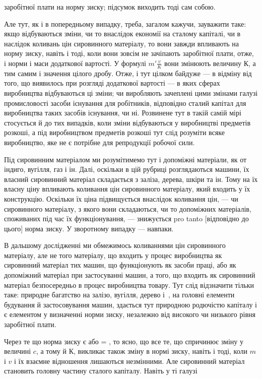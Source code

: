 \parcont{}  %
заробітної плати на норму зиску; підсумок виходить тоді сам
собою.

Але тут, як і в попередньому випадку, треба, загалом кажучи, зауважити таке: якщо відбуваються
зміни, чи то внаслідок економії на сталому капіталі, чи в наслідок коливань цін сировинного
матеріалу, то вони завжди впливають на норму
зиску, навіть і тоді, коли вони зовсім не зачіпають заробітної плати, отже, і норми і маси
додаткової вартості. У формулі $m' \frac{v}{K}$ вони змінюють величину $К$, а тим самим і значення цілого дробу.
Отже, і тут цілком байдуже — в відміну від того, що виявилось при розгляді додаткової вартості — в
яких сферах виробництва відбуваються ці зміни; чи виробляють зачеплені цими змінами галузі
промисловості засоби існування для робітників,
відповідно сталий капітал для виробництва таких засобів існування, чи ні. Розвинене тут в такій
самій мірі стосується й до
тих випадків, коли зміни відбуваються у виробництві предметів
розкоші, а під виробництвом предметів розкоші тут слід розуміти всяке виробництво, яке не є потрібне
для репродукції робочої сили.

Під сировинним матеріалом ми розумітимемо тут і допоміжні
матеріали, як от індиго, вугілля, газ і ін. Далі, оскільки в цій
рубриці розглядаються машини, їх власний сировинний матеріал
складається з заліза, дерева, шкіри та ін. Тому на їх власну
ціну впливають коливання цін сировинного матеріалу, який входить у їх конструкцію. Оскільки їх ціна
підвищується внаслідок коливання цін, — чи сировинного матеріалу, з якого вони складаються, чи то
допоміжних матеріалів, споживаних під час
їх функціонування, — знижується pro tanto [відповідно до цього]
норма зиску. У зворотному випадку — навпаки.

В дальшому дослідженні ми обмежимось коливаннями цін сировинного матеріалу, але не того матеріалу,
що входить у процес виробництва як сировинний матеріал тих машин, що функціонують як засоби праці,
або як допоміжний матеріал при застосуванні машин, а того, що входить як сировинний матеріал
безпосередньо в процес виробництва товару. Тут слід відзначити тільки таке: природне багатство на
залізо, вугілля, дерево
і~, на головні елементи будування й застосовування машин,
здається тут природною родючістю капіталу і є елементом
у визначенні норми зиску, незалежно від високого чи низького
рівня заробітної плати.

Через те що норма зиску є  або = , то ясно, що все те, що спричинює
зміну у величині $c$, а тому й $К$, викликає
також зміну в нормі зиску, навіть і тоді, коли $m$ і $v$ і їх взаємне
відношення лишаються незмінними. Але сировинний матеріал
становить головну частину сталого капіталу. Навіть у ті галузі
\parbreak{}  %
